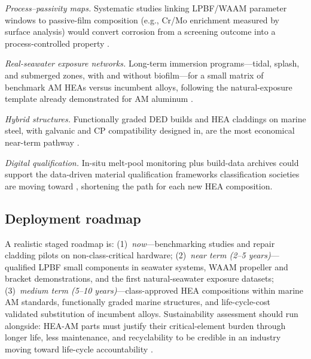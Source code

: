 \emph{Process--passivity maps.} Systematic studies linking LPBF/WAAM parameter windows to passive-film composition (e.g., Cr/Mo enrichment measured by surface analysis) would convert corrosion from a screening outcome into a process-controlled property \cite{slm_ehea_2025,lpbf_coocrw2023}.

\emph{Real-seawater exposure networks.} Long-term immersion programs---tidal, splash, and submerged zones, with and without biofilm---for a small matrix of benchmark AM HEAs versus incumbent alloys, following the natural-exposure template already demonstrated for AM aluminum \cite{am_alsi10mg_2026}.

\emph{Hybrid structures.} Functionally graded DED builds and HEA claddings on marine steel, with galvanic and CP compatibility designed in, are the most economical near-term pathway \cite{jiang2019clad,cagirici2024}.

\emph{Digital qualification.} In-situ melt-pool monitoring plus build-data archives could support the data-driven material qualification frameworks classification societies are moving toward \cite{dnvstb203,abs_mam}, shortening the path for each new HEA composition.

\subsection{Deployment roadmap}

A realistic staged roadmap is: (1)~\emph{now}---benchmarking studies and repair cladding pilots on non-class-critical hardware; (2)~\emph{near term (2--5 years)}---qualified LPBF small components in seawater systems, WAAM propeller and bracket demonstrations, and the first natural-seawater exposure datasets; (3)~\emph{medium term (5--10 years)}---class-approved HEA compositions within marine AM standards, functionally graded marine structures, and life-cycle-cost validated substitution of incumbent alloys. Sustainability assessment should run alongside: HEA-AM parts must justify their critical-element burden through longer life, less maintenance, and recyclability to be credible in an industry moving toward life-cycle accountability \cite{nass2025marine}.
